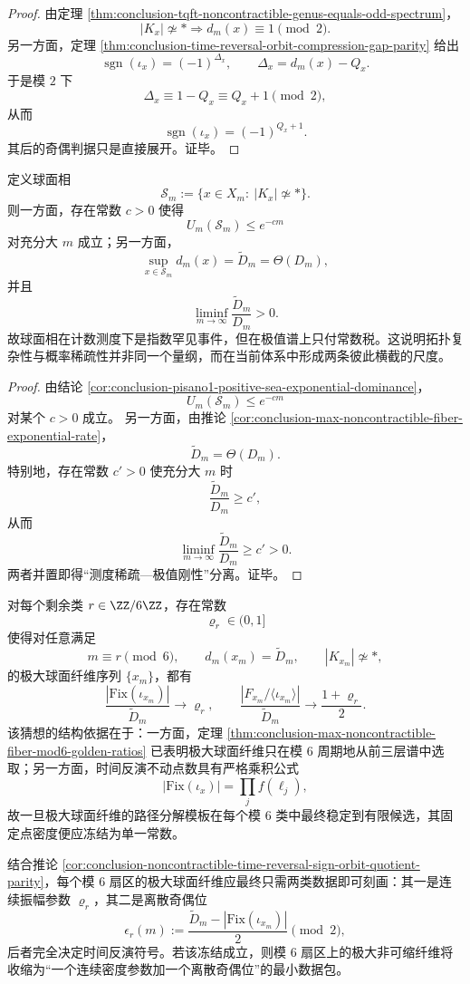 \begin{proof}
由定理 \ref{thm:conclusion-tqft-noncontractible-genus-equals-odd-spectrum}，
\[
|K_x|\not\simeq * \Longrightarrow d_m(x)\equiv 1\pmod 2.
\]
另一方面，定理 \ref{thm:conclusion-time-reversal-orbit-compression-gap-parity} 给出
\[
\operatorname{sgn}(\iota_x)=(-1)^{\Delta_x},
\qquad
\Delta_x=d_m(x)-Q_x.
\]
于是模 \(2\) 下
\[
\Delta_x\equiv 1-Q_x\equiv Q_x+1\pmod 2,
\]
从而
\[
\operatorname{sgn}(\iota_x)=(-1)^{Q_x+1}.
\]
其后的奇偶判据只是直接展开。证毕。
\end{proof}

\begin{theorem}[测度稀疏性与极值刚性的严格分离]\label{thm:conclusion-spherical-phase-measure-sparsity-extremal-rigidity-separation}
定义球面相
\[
\mathcal S_m:=\{x\in X_m:\ |K_x|\not\simeq *\}.
\]
则一方面，存在常数 \(c>0\) 使得
\[
U_m(\mathcal S_m)\le e^{-cm}
\]
对充分大 \(m\) 成立；另一方面，
\[
\sup_{x\in\mathcal S_m}d_m(x)=\widetilde D_m=\Theta(D_m),
\]
并且
\[
\liminf_{m\to\infty}\frac{\widetilde D_m}{D_m}>0.
\]
故球面相在计数测度下是指数罕见事件，但在极值谱上只付常数税。这说明拓扑复杂性与概率稀疏性并非同一个量纲，而在当前体系中形成两条彼此横截的尺度。
\end{theorem}

\begin{proof}
由结论 \ref{cor:conclusion-pisano1-positive-sea-exponential-dominance}，
\[
U_m(\mathcal S_m)\le e^{-cm}
\]
对某个 \(c>0\) 成立。
另一方面，由推论 \ref{cor:conclusion-max-noncontractible-fiber-exponential-rate}，
\[
\widetilde D_m=\Theta(D_m).
\]
特别地，存在常数 \(c'>0\) 使充分大 \(m\) 时
\[
\frac{\widetilde D_m}{D_m}\ge c',
\]
从而
\[
\liminf_{m\to\infty}\frac{\widetilde D_m}{D_m}\ge c'>0.
\]
两者并置即得“测度稀疏—极值刚性”分离。证毕。
\end{proof}

\begin{conjecture}[极大球面纤维的时间反演商比收敛]\label{conj:conclusion-maxsphere-fiber-time-reversal-orbit-ratio}
对每个剩余类 \(r\in\ZZ/6\ZZ\)，存在常数
\[
\varrho_r\in(0,1]
\]
使得对任意满足
\[
m\equiv r\pmod 6,
\qquad
d_m(x_m)=\widetilde D_m,
\qquad
|K_{x_m}|\not\simeq *,
\]
的极大球面纤维序列 \(\{x_m\}\)，都有
\[
\frac{|\mathrm{Fix}(\iota_{x_m})|}{\widetilde D_m}\longrightarrow \varrho_r,
\qquad
\frac{|F_{x_m}/\langle \iota_{x_m}\rangle|}{\widetilde D_m}
\longrightarrow
\frac{1+\varrho_r}{2}.
\]
该猜想的结构依据在于：一方面，定理 \ref{thm:conclusion-max-noncontractible-fiber-mod6-golden-ratios} 已表明极大球面纤维只在模 \(6\) 周期地从前三层谱中选取；另一方面，时间反演不动点数具有严格乘积公式
\[
|\mathrm{Fix}(\iota_x)|=\prod_j f(\ell_j),
\]
故一旦极大球面纤维的路径分解模板在每个模 \(6\) 类中最终稳定到有限候选，其固定点密度便应冻结为单一常数。

结合推论 \ref{cor:conclusion-noncontractible-time-reversal-sign-orbit-quotient-parity}，每个模 \(6\) 扇区的极大球面纤维应最终只需两类数据即可刻画：其一是连续振幅参数 \(\varrho_r\)，其二是离散奇偶位
\[
\epsilon_r(m):=\frac{\widetilde D_m-|\mathrm{Fix}(\iota_{x_m})|}{2}\pmod 2,
\]
后者完全决定时间反演符号。若该冻结成立，则模 \(6\) 扇区上的极大非可缩纤维将收缩为“一个连续密度参数加一个离散奇偶位”的最小数据包。
\end{conjecture}
